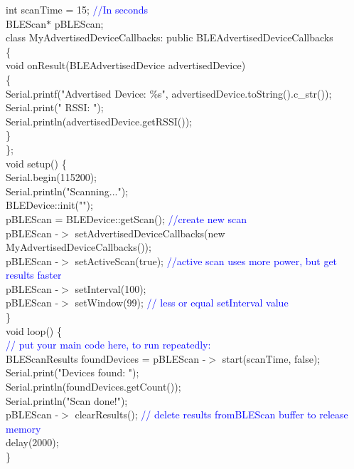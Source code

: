 \documentclass[12pt,a4paper]{article}
\begin{document}
int scanTime = 15;  \textcolor{blue}{//In seconds}\\
BLEScan$*$ pBLEScan;\\

class  MyAdvertisedDeviceCallbacks: public  BLEAdvertisedDeviceCallbacks\\
\{\\
    void onResult(BLEAdvertisedDevice  advertisedDevice)\\
    \{\\
Serial.printf("Advertised Device: \%s", advertisedDevice.toString().c\_str());\\
      Serial.print(" RSSI: ");\\
      Serial.println(advertisedDevice.getRSSI());\\
   \}\\
\};\\[15pt]

void setup() \{\\
  Serial.begin(115200);\\
  Serial.println("Scanning...");\\[10pt]

  BLEDevice::init("");\\
  pBLEScan = BLEDevice::getScan(); \textcolor{blue}{ //create new scan}\\
  pBLEScan -$>$ setAdvertisedDeviceCallbacks(new MyAdvertisedDeviceCallbacks());\\
  pBLEScan -$>$ setActiveScan(true); \textcolor{blue}{ //active scan uses more power, but get results faster}\\
  pBLEScan -$>$ setInterval(100);\\
  pBLEScan -$>$ setWindow(99);   \textcolor{blue}{// less or equal setInterval value}\\
\}\\[15pt]

void loop() \{\\
   \textcolor{blue}{// put your main code here, to run repeatedly:}\\
  BLEScanResults foundDevices = pBLEScan -$>$ start(scanTime, false);\\
  Serial.print("Devices found: ");\\
  Serial.println(foundDevices.getCount());\\
  Serial.println("Scan done!");\\
  pBLEScan -$>$ clearResults();  \textcolor{blue}{ // delete results fromBLEScan buffer to release memory}\\
  delay(2000);\\
\}\\[15pt]
  
\end{document}
